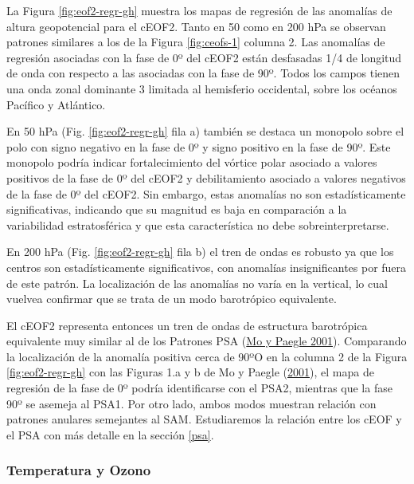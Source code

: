 \documentclass[12pt,oneside,a4paper]{reedthesis}
\begin{document}
La Figura \ref{fig:eof2-regr-gh} muestra los mapas de regresión de las anomalías de altura geopotencial para el cEOF2.
Tanto en 50 como en 200 hPa se observan patrones similares a los de la Figura \ref{fig:ceofs-1} columna 2.
Las anomalías de regresión asociadas con la fase de 0º del cEOF2 están desfasadas 1/4 de longitud de onda con respecto a las asociadas con la fase de 90º.
Todos los campos tienen una onda zonal dominante 3 limitada al hemisferio occidental, sobre los océanos Pacífico y Atlántico.

En 50 hPa (Fig. \ref{fig:eof2-regr-gh} fila a) también se destaca un monopolo sobre el polo con signo negativo en la fase de 0º y signo positivo en la fase de 90º.
Este monopolo podría indicar fortalecimiento del vórtice polar asociado a valores positivos de la fase de 0º del cEOF2 y debilitamiento asociado a valores negativos de la fase de 0º del cEOF2.
Sin embargo, estas anomalías no son estadísticamente significativas, indicando que su magnitud es baja en comparación a la variabilidad estratosférica y que esta característica no debe sobreinterpretarse.

En 200 hPa (Fig. \ref{fig:eof2-regr-gh} fila b) el tren de ondas es robusto ya que los centros son estadísticamente significativos, con anomalías insignificantes por fuera de este patrón.
La localización de las anomalías no varía en la vertical, lo cual vuelvea confirmar que se trata de un modo barotrópico equivalente.

El cEOF2 representa entonces un tren de ondas de estructura barotrópica equivalente muy similar al de los Patrones PSA (\protect\hyperlink{ref-mo2001}{Mo y Paegle 2001}).
Comparando la localización de la anomalía positiva cerca de 90ºO en la columna 2 de la Figura \ref{fig:eof2-regr-gh} con las Figuras 1.a y b de Mo y Paegle (\protect\hyperlink{ref-mo2001}{2001}), el mapa de regresión de la fase de 0º podría identificarse con el PSA2, mientras que la fase 90º se asemeja al PSA1.
Por otro lado, ambos modos muestran relación con patrones anulares semejantes al SAM.
Estudiaremos la relación entre los cEOF y el PSA con más detalle en la sección \ref{psa}.

\hypertarget{temperatura-y-ozono}{%
\subsubsection{Temperatura y Ozono}\label{temperatura-y-ozono}}
\end{document}
